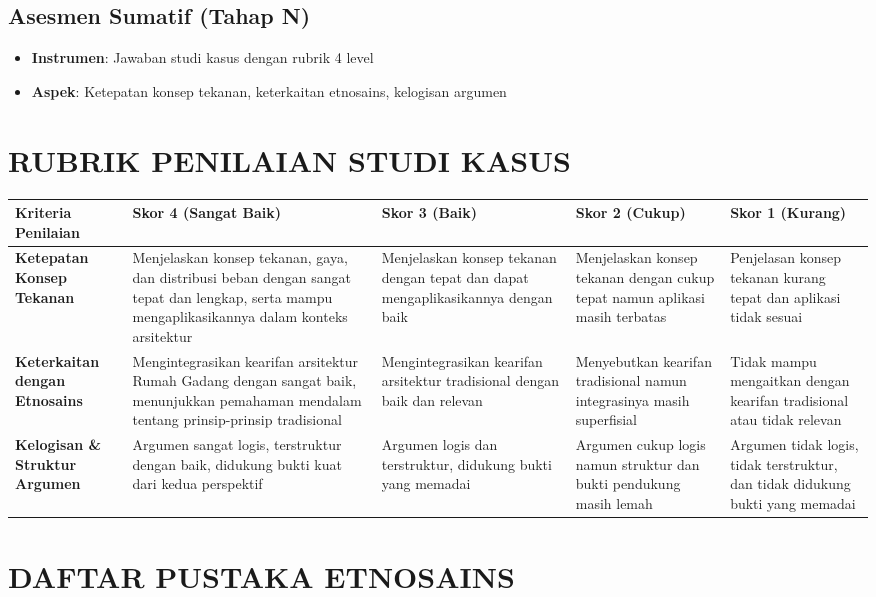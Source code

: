 \documentclass[12pt,a4paper]{article}
\begin{document}
\subsection{Asesmen Sumatif (Tahap N)}
\begin{itemize}
\item \textbf{Instrumen}: Jawaban studi kasus dengan rubrik 4 level
\item \textbf{Aspek}: Ketepatan konsep tekanan, keterkaitan etnosains, kelogisan argumen
\end{itemize}

\section{RUBRIK PENILAIAN STUDI KASUS}

\begin{longtable}{|p{3cm}|p{3cm}|p{3cm}|p{3cm}|p{3cm}|}
\hline
\textbf{Kriteria Penilaian} & \textbf{Skor 4 (Sangat Baik)} & \textbf{Skor 3 (Baik)} & \textbf{Skor 2 (Cukup)} & \textbf{Skor 1 (Kurang)} \\
\hline
\textbf{Ketepatan Konsep Tekanan} & Menjelaskan konsep tekanan, gaya, dan distribusi beban dengan sangat tepat dan lengkap, serta mampu mengaplikasikannya dalam konteks arsitektur & Menjelaskan konsep tekanan dengan tepat dan dapat mengaplikasikannya dengan baik & Menjelaskan konsep tekanan dengan cukup tepat namun aplikasi masih terbatas & Penjelasan konsep tekanan kurang tepat dan aplikasi tidak sesuai \\
\hline
\textbf{Keterkaitan dengan Etnosains} & Mengintegrasikan kearifan arsitektur Rumah Gadang dengan sangat baik, menunjukkan pemahaman mendalam tentang prinsip-prinsip tradisional & Mengintegrasikan kearifan arsitektur tradisional dengan baik dan relevan & Menyebutkan kearifan tradisional namun integrasinya masih superfisial & Tidak mampu mengaitkan dengan kearifan tradisional atau tidak relevan \\
\hline
\textbf{Kelogisan \& Struktur Argumen} & Argumen sangat logis, terstruktur dengan baik, didukung bukti kuat dari kedua perspektif & Argumen logis dan terstruktur, didukung bukti yang memadai & Argumen cukup logis namun struktur dan bukti pendukung masih lemah & Argumen tidak logis, tidak terstruktur, dan tidak didukung bukti yang memadai \\
\hline
\end{longtable}

\section{DAFTAR PUSTAKA ETNOSAINS}
\end{document}
